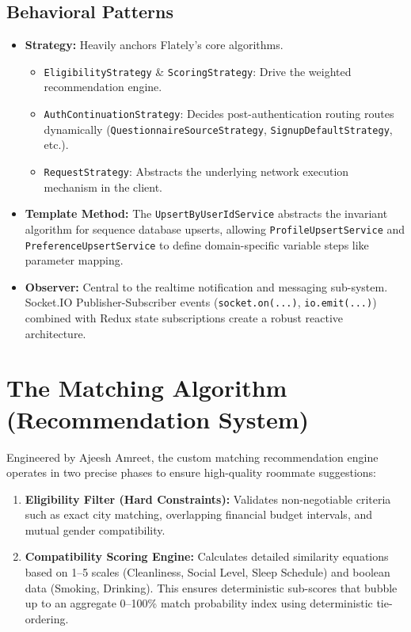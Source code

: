 \documentclass[12pt,a4paper]{article}
\begin{document}
\subsection{Behavioral Patterns}
\begin{itemize}[leftmargin=*]
    \item \textbf{Strategy:} Heavily anchors Flately's core algorithms.
    \begin{itemize}
        \item \texttt{EligibilityStrategy} \& \texttt{ScoringStrategy}: Drive the weighted recommendation engine.
        \item \texttt{AuthContinuationStrategy}: Decides post-authentication routing routes dynamically (\texttt{QuestionnaireSourceStrategy}, \texttt{SignupDefaultStrategy}, etc.).
        \item \texttt{RequestStrategy}: Abstracts the underlying network execution mechanism in the client.
    \end{itemize}
    \item \textbf{Template Method:} The \texttt{UpsertByUserIdService} abstracts the invariant algorithm for sequence database upserts, allowing \texttt{ProfileUpsertService} and \texttt{PreferenceUpsertService} to define domain-specific variable steps like parameter mapping.
    \item \textbf{Observer:} Central to the realtime notification and messaging sub-system. Socket.IO Publisher-Subscriber events (\texttt{socket.on(...)}, \texttt{io.emit(...)}) combined with Redux state subscriptions create a robust reactive architecture.
\end{itemize}

\section{The Matching Algorithm (Recommendation System)}
Engineered by Ajeesh Amreet, the custom matching recommendation engine operates in two precise phases to ensure high-quality roommate suggestions:
\begin{enumerate}
    \item \textbf{Eligibility Filter (Hard Constraints):} Validates non-negotiable criteria such as exact city matching, overlapping financial budget intervals, and mutual gender compatibility.
    \item \textbf{Compatibility Scoring Engine:} Calculates detailed similarity equations based on 1--5 scales (Cleanliness, Social Level, Sleep Schedule) and boolean data (Smoking, Drinking). This ensures deterministic sub-scores that bubble up to an aggregate 0--100\% match probability index using deterministic tie-ordering.
\end{enumerate}
\end{document}
